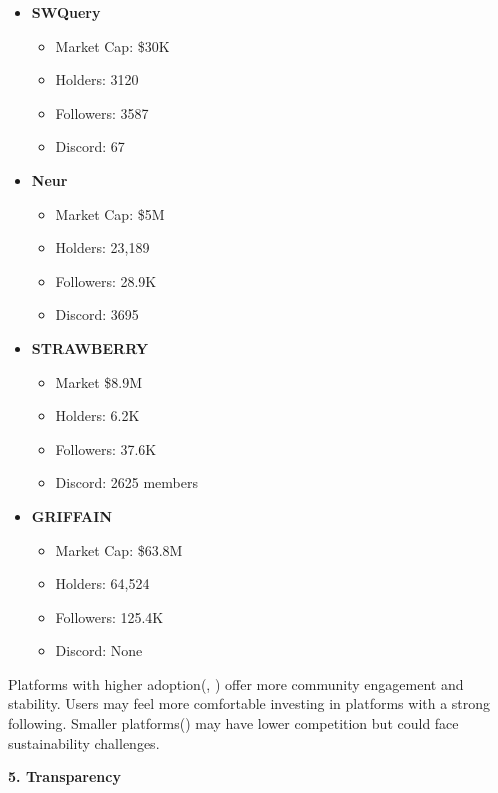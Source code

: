 \documentclass[
]{article}
\providecommand{\tightlist}{%
  \setlength{\itemsep}{0pt}\setlength{\parskip}{0pt}}
\begin{document}
\begin{itemize}
\tightlist
\item
  \textbf{SWQuery}

  \begin{itemize}
  \tightlist
  \item
    Market Cap: \$30K
  \item
    Holders: 3120
  \item
    Followers: 3587
  \item
    Discord: 67
  \end{itemize}
\item
  \textbf{Neur}

  \begin{itemize}
  \tightlist
  \item
    Market Cap: \$5M
  \item
    Holders: 23,189
  \item
    Followers: 28.9K
  \item
    Discord: 3695
  \end{itemize}
\item
  \textbf{STRAWBERRY}

  \begin{itemize}
  \tightlist
  \item
    Market \$8.9M
  \item
    Holders: 6.2K
  \item
    Followers: 37.6K
  \item
    Discord: 2625 members
  \end{itemize}
\item
  \textbf{GRIFFAIN}

  \begin{itemize}
  \tightlist
  \item
    Market Cap: \$63.8M
  \item
    Holders: 64,524
  \item
    Followers: 125.4K
  \item
    Discord: None
  \end{itemize}
\end{itemize}

Platforms with higher adoption(\cite{griffain2025}, \cite{strawberry2025}) offer more
community engagement and stability. Users may feel more comfortable
investing in platforms with a strong following. Smaller
platforms(\cite{swquery2025}) may have lower competition but could face
sustainability challenges.

\textbf{5. Transparency}
\end{document}
